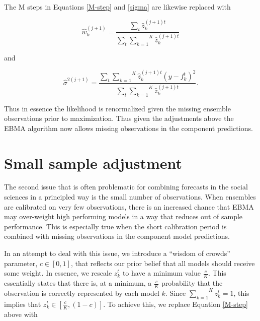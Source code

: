 \documentclass[12pt,fullpage,endnotes]{article}
\begin{document}
\noindent  The M steps in Equations \ref{M-step} and \ref{sigma} are likewise replaced with

\begin{equation}
\hat{w}^{(j+1)}_k=\frac{\underset{t}{\sum}\hat{z}^{(j+1)t}_{k}}{\underset{t}{\sum}\overset{K}{\underset{k=1}{ \sum}} \hat{z}_k^{(j+1)t}}
\end{equation}


\noindent and

\begin{equation}
\hat{\sigma}^{2(j+1)}=\frac{\underset{t}{\sum}\overset{K}{\underset{k=1}{\sum}}\hat{z}^{(j+1)t}_{k}(y-f_{k}^{t})^2 }{\underset{t}{\sum}\overset{K}{\underset{k=1}{ \sum}} \hat{z}_k^{(j+1)t}}.
\end{equation}

Thus in essence the likelihood is renormalized given the missing ensemble observations prior to maximization. Thus given the adjustments above the EBMA algorithm now allows missing observations in the component predictions.

\section{Small sample adjustment}
\label{woc}
The second issue that is often problematic for combining forecasts in the social sciences in a principled way is the small number of observations. When ensembles are calibrated on very few observations, there is an increased chance that EBMA may over-weight high performing models in a way that reduces out of sample performance. This is especially true when the short calibration period is combined with missing observations in the component model predictions. %

In an attempt to deal with this issue, we introduce a ``wisdom of crowds'' parameter, $c \in [0,1]$, that reflects our prior
belief that all models should receive some weight.  In essence, we
rescale $z^t_k$ to have a minimum value $\frac{c}{K}$.  This
essentially states that there is, at a minimum, a $\frac{c}{K}$
probability that the observation is correctly represented by each
model $k$.  Since $\overset{K}{\underset{k=1}{\sum}} z_k^t = 1$, this
implies that $z_k^t \in [\frac{c}{K}, (1-c)]$.  To achieve this, we
replace Equation \ref{M-step} above with
\end{document}
